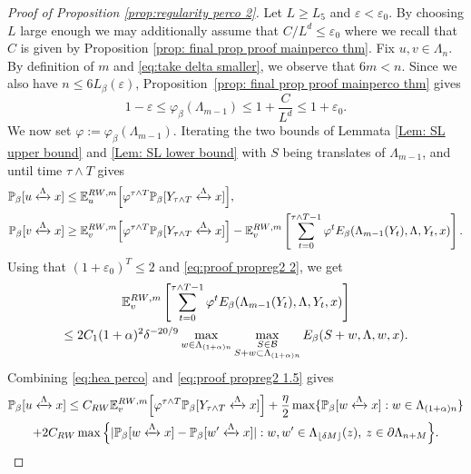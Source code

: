 \documentclass[10pt,a4paper]{amsart}
\newcommand{\connect}{\xleftrightarrow}
\begin{document}
\begin{proof}[Proof of Proposition \textup{\ref{prop:regularity perco 2}}]
Let $L\geq L_5$ and $\varepsilon<\varepsilon_0$. By choosing $L$ large enough we may additionally assume that $C/L^d\leq \varepsilon_0$ where we recall that $C$ is given by Proposition \ref{prop: final prop proof mainperco thm}. Fix $u,v\in \Lambda_n$. By definition of $m$ and \eqref{eq:take delta smaller}, we observe that $6m<n$. Since we also have $n\le 6L_\beta(\varepsilon)$, Proposition~\ref{prop: final prop proof mainperco thm} gives
\begin{equation}
1-\varepsilon\le \varphi_\beta(\Lambda_{m-1})\le 1+\frac{C}{L^d}\le 1+\varepsilon_0.
\end{equation}
We now set $\varphi:=\varphi_\beta(\Lambda_{m-1})$. Iterating the two bounds of Lemmata \ref{Lem: SL upper bound} and \ref{Lem: SL lower bound} with $S$ being translates of $\Lambda_{m-1}$, and until time $\tau\wedge T$ gives \begin{align}
\mathbb P_\beta[u\connect{\Lambda\:}x]&\le  \mathbb E_{u}^{{\rm RW},m}\Big[\varphi^{\tau\wedge T} \mathbb P_\beta[Y_{\tau\wedge T}\connect{\Lambda\:}x]\Big],\label{eq:hea perco}\\
\mathbb P_\beta[v\connect{\Lambda\:}x]&\ge \mathbb E_{v}^{{\rm RW},m}\Big[\varphi^{\tau\wedge T} \mathbb P_\beta[Y_{\tau\wedge T}\connect{\Lambda\:}x]\Big]-\mathbb E_{v}^{{\rm RW},m}\left[\sum_{t=0}^{\tau\wedge T-1}\varphi^t{E}_\beta(\Lambda_{m-1}(Y_t),\Lambda,Y_t,x)\right].\label{eq:hda perco}
\end{align}
Using that $(1+\varepsilon_0)^T\leq 2$ and \eqref{eq:proof propreg2 2}, we get
\begin{multline}\label{eq:proof propref2 2.5}
	\mathbb E_{v}^{{\rm RW},m}\left[\sum_{t=0}^{\tau\wedge T-1}\varphi^t{E}_\beta(\Lambda_{m-1}(Y_t),\Lambda,Y_t,x)\right]\\\leq 2C_1(1+\alpha)^2\delta^{-20/9}\max_{w\in \Lambda_{(1+\alpha)n}}\max_{\substack{S\in \mathcal B\\S+w\subset \Lambda_{(1+\alpha)n}}}{E}_\beta(S+w, \Lambda,w,x).
\end{multline}
Combining \eqref{eq:hea perco} and \eqref{eq:proof propreg2 1.5} gives
\begin{multline}\label{eq:proof propreg2 3}
	\mathbb P_\beta[u\connect{\Lambda\:}x]\leq C_{\rm RW}\mathbb E_v^{{\rm RW},m}\Big[\varphi^{\tau\wedge T}\mathbb P_\beta[Y_{\tau \wedge T}\connect{\Lambda\:}x]\Big]+\frac{\eta}{2}\max\{\mathbb P_\beta[w\connect{\Lambda\:}x]:w\in \Lambda_{(1+\alpha)n}\}\\+2C_{\rm RW}\max \Big\{|\mathbb P_\beta[w\connect{\Lambda\:}x]-\mathbb P_\beta[w'\connect{\Lambda\:}x]|: w,w'\in \Lambda_{\lfloor \delta M\rfloor}(z), \: z\in \partial \Lambda_{n+M}\Big\}. 

\end{multline}
\end{proof}
\end{document}
